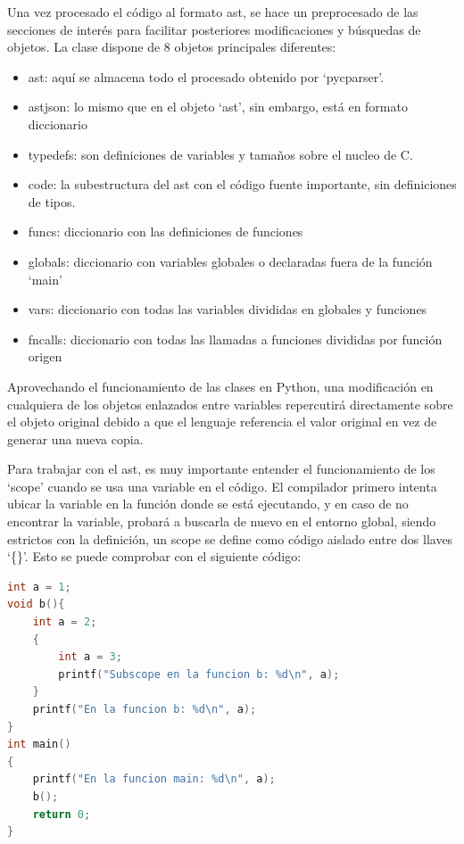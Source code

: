 Una vez procesado el código al formato \acrshort{ast}, se hace un preprocesado de las secciones de interés para facilitar posteriores modificaciones y búsquedas de objetos. La clase dispone de 8 objetos principales diferentes:
\begin{itemize}
    \item ast: aquí se almacena todo el procesado obtenido por `pycparser'.
    \item astjson: lo mismo que en el objeto `ast', sin embargo, está en formato diccionario
    \item typedefs:  son definiciones de variables y tamaños sobre el nucleo de C.
    \item code: la subestructura del \acrshort{ast} con el código fuente importante, sin definiciones de tipos.
    \item funcs: diccionario con las definiciones de funciones
    \item globals: diccionario con variables globales o declaradas fuera de la función `main'
    \item vars: diccionario con todas las variables divididas en globales y funciones
    \item fncalls: diccionario con todas las llamadas a funciones divididas por función origen
\end{itemize}

Aprovechando el funcionamiento de las clases en Python, una modificación en cualquiera de los objetos enlazados entre variables repercutirá directamente sobre el objeto original debido a que el lenguaje referencia el valor original en vez de generar una nueva copia.

Para trabajar con el \acrshort{ast}, es muy importante entender el funcionamiento de los `scope' cuando se usa una variable en el código. El compilador primero intenta ubicar la variable en la función donde se está ejecutando, y en caso de no encontrar la variable, probará a buscarla de nuevo en el entorno global, siendo estrictos con la definición, un scope se define como código aislado entre dos llaves `\{\}'. Esto se puede comprobar con el siguiente código:
\pagebreak
\begin{lstlisting}[language=C, caption=Scopes en C]
int a = 1;
void b(){
    int a = 2;
    {
        int a = 3;
        printf("Subscope en la funcion b: %d\n", a);
    }
    printf("En la funcion b: %d\n", a);
}
int main()
{
    printf("En la funcion main: %d\n", a);
    b();
    return 0;
}
\end{lstlisting}

